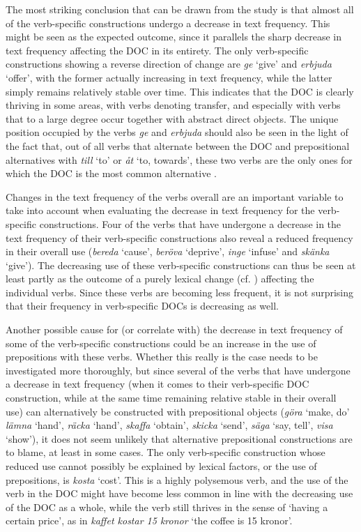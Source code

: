 \documentclass[output=paper]{langscibook}
\begin{document}
The most striking conclusion that can be drawn from the study is that almost all of the verb-specific constructions undergo a decrease in text frequency. This might be seen as the expected outcome, since it parallels the sharp decrease in text frequency affecting the DOC in its entirety. The only verb-specific constructions showing a reverse direction of change are \textit{ge} ‘give’ and \textit{erbjuda} ‘offer’, with the former actually increasing in text frequency, while the latter simply remains relatively stable over time. This indicates that the DOC is clearly thriving in some areas, with verbs denoting transfer, and especially with verbs that to a large degree occur together with abstract direct objects. The unique position occupied by the verbs \textit{ge} and \textit{erbjuda} should also be seen in the light of the fact that, out of all verbs that alternate between the DOC and prepositional alternatives with \textit{till} ‘to’ or \textit{åt} ‘to, towards’, these two verbs are the only ones for which the DOC is the most common alternative \citep{Valdeson2017}.


Changes in the text frequency of the verbs overall are an important variable to take into account when evaluating the decrease in text frequency for the verb-specific constructions. Four of the verbs that have undergone a decrease in the text frequency of their verb-specific constructions also reveal a reduced frequency in their overall use (\textit{bereda} ‘cause’, \textit{beröva} ‘deprive’, \textit{inge} ‘infuse’ and \textit{skänka} ‘give’). The decreasing use of these verb-specific constructions can thus be seen at least partly as the outcome of a purely lexical change (cf. \citealt[192]{CollemanDe_Clerck2011}) affecting the individual verbs. Since these verbs are becoming less frequent, it is not surprising that their frequency in verb-specific DOCs is decreasing as well.


Another possible cause for (or correlate with) the decrease in text frequency of some of the verb-specific constructions could be an increase in the use of prepositions with these verbs. Whether this really is the case needs to be investigated more thoroughly, but since several of the verbs that have undergone a decrease in text frequency (when it comes to their verb-specific DOC construction, while at the same time remaining relative stable in their overall use) can alternatively be constructed with prepositional objects (\textit{göra} ‘make, do’ \textit{lämna} ‘hand’, \textit{räcka} ‘hand’, \textit{skaffa} ‘obtain’, \textit{skicka} ‘send’, \textit{säga} ‘say, tell’, \textit{visa} ‘show’), it does not seem unlikely that alternative prepositional constructions are to blame, at least in some cases. The only verb-specific construction whose reduced use cannot possibly be explained by lexical factors, or the use of prepositions, is \textit{kosta} ‘cost’. This is a highly polysemous verb, and the use of the verb in the DOC might have become less common in line with the decreasing use of the DOC as a whole, while the verb still thrives in the sense of ‘having a certain price’, as in \textit{kaffet kostar 15 kronor} ‘the coffee is 15 kronor’.
\end{document}
